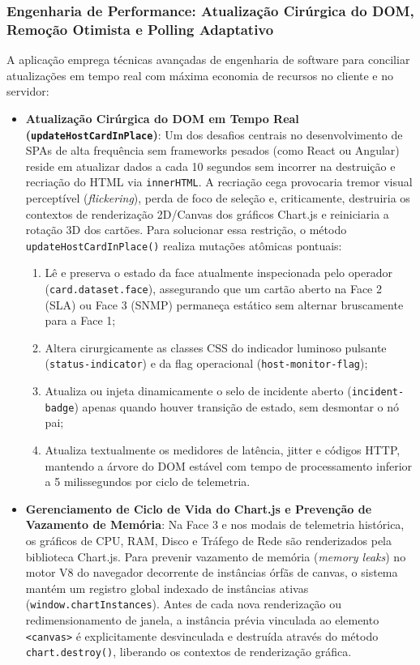 \documentclass[12pt,a4paper]{article}
\begin{document}
\subsubsection{Engenharia de Performance: Atualização Cirúrgica do DOM, Remoção Otimista e Polling Adaptativo}
A aplicação emprega técnicas avançadas de engenharia de software para conciliar atualizações em tempo real com máxima economia de recursos no cliente e no servidor:
\begin{itemize}[leftmargin=1.25cm]
\item \textbf{Atualização Cirúrgica do DOM em Tempo Real (\texttt{updateHostCardInPlace})}: Um dos desafios centrais no desenvolvimento de SPAs de alta frequência sem frameworks pesados (como React ou Angular) reside em atualizar dados a cada 10 segundos sem incorrer na destruição e recriação do HTML via \texttt{innerHTML}. A recriação cega provocaria tremor visual perceptível (\textit{flickering}), perda de foco de seleção e, criticamente, destruiria os contextos de renderização 2D/Canvas dos gráficos Chart.js e reiniciaria a rotação 3D dos cartões. Para solucionar essa restrição, o método \texttt{updateHostCardInPlace()} realiza mutações atômicas pontuais:
  \begin{enumerate}
  \item Lê e preserva o estado da face atualmente inspecionada pelo operador (\texttt{card.dataset.face}), assegurando que um cartão aberto na Face 2 (SLA) ou Face 3 (SNMP) permaneça estático sem alternar bruscamente para a Face 1;
  \item Altera cirurgicamente as classes CSS do indicador luminoso pulsante (\texttt{status-indicator}) e da flag operacional (\texttt{host-monitor-flag});
  \item Atualiza ou injeta dinamicamente o selo de incidente aberto (\texttt{incident-badge}) apenas quando houver transição de estado, sem desmontar o nó pai;
  \item Atualiza textualmente os medidores de latência, jitter e códigos HTTP, mantendo a árvore do DOM estável com tempo de processamento inferior a 5 milissegundos por ciclo de telemetria.
  \end{enumerate}
\item \textbf{Gerenciamento de Ciclo de Vida do Chart.js e Prevenção de Vazamento de Memória}: Na Face 3 e nos modais de telemetria histórica, os gráficos de CPU, RAM, Disco e Tráfego de Rede são renderizados pela biblioteca Chart.js. Para prevenir vazamento de memória (\textit{memory leaks}) no motor V8 do navegador decorrente de instâncias órfãs de canvas, o sistema mantém um registro global indexado de instâncias ativas (\texttt{window.chartInstances}). Antes de cada nova renderização ou redimensionamento de janela, a instância prévia vinculada ao elemento \texttt{<canvas>} é explicitamente desvinculada e destruída através do método \texttt{chart.destroy()}, liberando os contextos de renderização gráfica.

\end{itemize}
\end{document}

